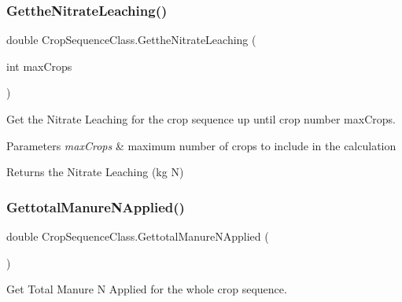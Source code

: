 \subsubsection{\texorpdfstring{GettheNitrateLeaching()}{GettheNitrateLeaching()}\hspace{0.1cm}{\footnotesize\ttfamily [2/2]}}
{\footnotesize\ttfamily double Crop\+Sequence\+Class.\+Getthe\+Nitrate\+Leaching (\begin{DoxyParamCaption}\item[{int}]{max\+Crops }\end{DoxyParamCaption})\hspace{0.3cm}{\ttfamily [inline]}}



Get the Nitrate Leaching for the crop sequence up until crop number max\+Crops. 


\begin{DoxyParams}{Parameters}
{\em max\+Crops} & maximum number of crops to include in the calculation \\
\hline
\end{DoxyParams}
\begin{DoxyReturn}{Returns}
the Nitrate Leaching (kg N) 
\end{DoxyReturn}
\mbox{\label{class_crop_sequence_class_a01abdbc3d224f97bd267ce249dabb2c6}} 
\subsubsection{\texorpdfstring{GettotalManureNApplied()}{GettotalManureNApplied()}\hspace{0.1cm}{\footnotesize\ttfamily [1/2]}}
{\footnotesize\ttfamily double Crop\+Sequence\+Class.\+Gettotal\+Manure\+N\+Applied (\begin{DoxyParamCaption}{ }\end{DoxyParamCaption})\hspace{0.3cm}{\ttfamily [inline]}}



Get Total Manure N Applied for the whole crop sequence. 

\mbox{\label{class_crop_sequence_class_a60c079f8e1a758f2bd4f6124dd7acfcc}} 
